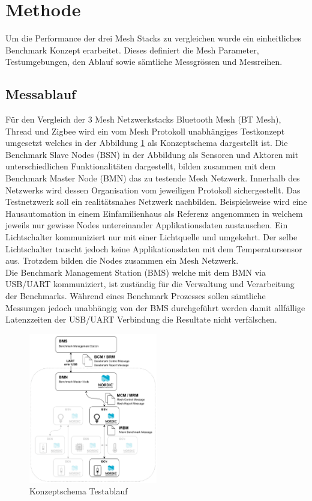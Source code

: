 \section{Methode}
Um die Performance der drei Mesh Stacks zu vergleichen wurde ein einheitliches Benchmark Konzept erarbeitet. Dieses definiert die Mesh Parameter, Testumgebungen, den Ablauf sowie sämtliche Messgrössen und Messreihen.

\subsection{Messablauf}
Für den Vergleich der 3 Mesh Netzwerkstacks Bluetooth Mesh (BT Mesh), Thread und Zigbee wird ein vom Mesh Protokoll unabhängiges Testkonzept umgesetzt welches in der Abbildung \ref{fig:KonzeptschemaTestablauf} als Konzeptschema dargestellt ist. Die Benchmark Slave Nodes (BSN) in der Abbildung als Sensoren und Aktoren mit unterschiedlichen Funktionalitäten dargestellt, bilden zusammen mit dem Benchmark Master Node (BMN) das zu testende Mesh Netzwerk. Innerhalb des Netzwerks wird dessen Organisation vom jeweiligen Protokoll sichergestellt. Das Testnetzwerk soll ein realitätsnahes Netzwerk nachbilden. Beispielsweise wird eine Hausautomation in einem Einfamilienhaus als Referenz angenommen in welchem jeweils nur gewisse Nodes untereinander Applikationsdaten austauschen. Ein Lichtschalter kommuniziert nur mit einer Lichtquelle und umgekehrt. Der selbe Lichtschalter tauscht jedoch keine Applikationsdaten mit dem Temperatursensor aus. Trotzdem bilden die Nodes zusammen ein Mesh Netzwerk.\\

Die Benchmark Management Station (BMS) welche mit dem BMN via USB/UART kommuniziert, ist zuständig für die Verwaltung und Verarbeitung der Benchmarks. Während eines Benchmark Prozesses sollen sämtliche Messungen jedoch unabhängig von der BMS durchgeführt werden damit allfällige Latenzzeiten der USB/UART Verbindung die Resultate nicht verfälschen.

\begin{figure}
	\centering
	\includegraphics[width=0.5\textwidth]{graphics/Mesh_Testkonzeptschema.png}
	\caption{Konzeptschema Testablauf}
	\label{fig:KonzeptschemaTestablauf}
\end{figure}

